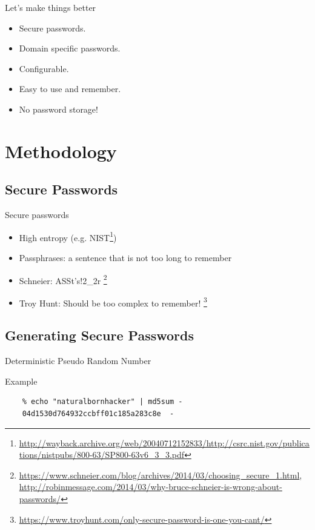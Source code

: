 \documentclass{beamer}
\begin{document}
\begin{frame}{Let's make things better}
  \begin{itemize}
    \item Secure passwords.
    \item Domain specific passwords.
    \item Configurable.
    \item Easy to use and remember.
    \item {\color{red} No password storage!}
  \end{itemize}
\end{frame}

\section{Methodology}
\subsection{Secure Passwords}
\begin{frame}{Secure passwords}
  \begin{itemize}
    \item High entropy (e.g. NIST\footnote{\url{http://wayback.archive.org/web/20040712152833/http://csrc.nist.gov/publications/nistpubs/800-63/SP800-63v6_3_3.pdf}})
    \item Passphrases: a sentence that is not too long to remember
    \item Schneier: ASSt's!2\_2r \footnote{\url{https://www.schneier.com/blog/archives/2014/03/choosing_secure_1.html}, \url{http://robinmessage.com/2014/03/why-bruce-schneier-is-wrong-about-passwords/}}
    \item Troy Hunt: Should be too complex to remember! \footnote{\url{https://www.troyhunt.com/only-secure-password-is-one-you-cant/}}
  \end{itemize}
\end{frame}

\subsection{Generating Secure Passwords}
\begin{frame}[fragile]{Deterministic Pseudo Random Number}
  \begin{block}{Example}
    \begin{verbatim}
    % echo "naturalbornhacker" | md5sum -
    04d1530d764932ccbff01c185a283c8e  -
    \end{verbatim}
  \end{block}
\end{frame}
\end{document}
